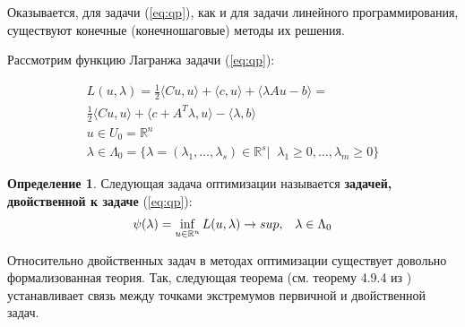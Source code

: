 \documentclass[a4paper, 12pt, titlepage]{article}
\theoremstyle{definition}
\newtheorem{SmartDefinition}{Определение}
\theoremstyle{plain}
\theoremstyle{plain}
\begin{document}
Оказывается, для задачи (\ref{eq:qp}), как и для задачи линейного
программирования, существуют конечные (конечношаговые) методы их решения.

Рассмотрим функцию Лагранжа задачи (\ref{eq:qp}):

\begin{equation}
 \begin{aligned}
 L(u, \lambda) = \frac{1}{2} \langle C u, u \rangle + \langle c, u \rangle +
 \langle \lambda A u - b \rangle = \\
 \frac{1}{2} \langle C u, u \rangle +
 \langle c + A^{T} \lambda, u \rangle - \langle \lambda, b \rangle \\
 u \in U_{0} = \mathbb{R}^{n} \\
 \lambda \in \Lambda_{0} = \{\lambda = (\lambda_{1}, \ldots, \lambda_{s})
 \in \mathbb{R}^{s} | \;\; \lambda_{1} \geq 0, \ldots, \lambda_{m} \geq 0 \}
 \end{aligned}
\end{equation}

\begin{SmartDefinition}
 Следующая задача оптимизации называется \textbf{задачей, двойственной к задаче}
 (\ref{eq:qp}):
 \begin{equation}
  \begin{aligned}
   \psi(\lambda) = \operatornamewithlimits{inf}_{u \in \mathbb{R}^{n}}
   L(u, \lambda) \to sup, \;\;\; \lambda \in \Lambda_{0}
  \end{aligned}
 \end{equation}
\end{SmartDefinition}

Относительно двойственных задач в методах оптимизации существует довольно
формализованная теория. Так, следующая теорема (см. теорему 4.9.4 
из \cite{Vasilev1980}) устанавливает связь между точками экстремумов
первичной и двойственной задач.
\end{document}
